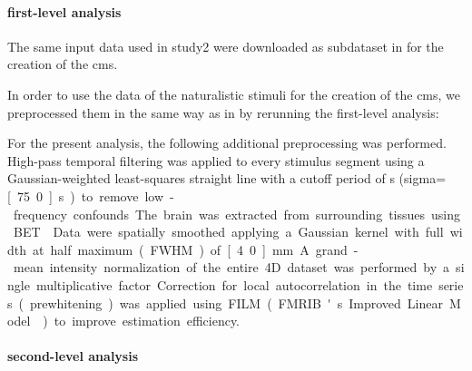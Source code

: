 \paragraph{first-level analysis}


The same input data used in study2 were downloaded as subdataset in
\citep{haeusler2021ppadata} for the creation of the \ac{cms}.

%
In order to use the data of the naturalistic stimuli for the creation of the
\ac{cms}, we preprocessed them in the same way as in
\citep{haeusler2022processing} by rerunning the first-level analysis:


For the present analysis, the following additional preprocessing was performed.
High-pass temporal filtering was applied to every stimulus segment using a
Gaussian-weighted least-squares straight line with a cutoff period of
\unit[150]{s} (sigma=\unit[75.0]{s}) to remove low-frequency confounds.
The brain was extracted from surrounding tissues using BET \citep{smith2002bet}.
Data were spatially smoothed applying a Gaussian kernel with full width at half
maximum (FWHM) of \unit[4.0]{mm}.
A grand-mean intensity normalization of the entire 4D dataset was performed by a
single multiplicative factor.
Correction for local autocorrelation in the time series (prewhitening) was
applied using FILM (FMRIB's Improved Linear Model \citep{woolrich2001autocorr})
to improve estimation efficiency.


\paragraph{second-level analysis}


